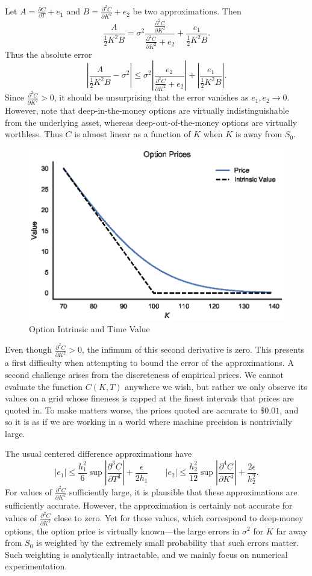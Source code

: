 \documentclass[12pt]{article}
\numberwithin{equation}{section}
\newcommand{\diff}[2]{\frac{\partial #1}{\partial #2}}
\newcommand{\abs}[1]{\left|#1\right|}
\begin{document}
Let $A = \diff{C}{T} + e_1$ and $B = \diff{^2C}{K^2} + e_2$ be two
approximations. Then \[ \frac{A}{\frac{1}{2}K^2 B} = \sigma^2
\frac{\diff{^2C}{K^2}}{\diff{^2C}{K^2} + e_2} + \frac{e_1}{\frac{1}{2}K^2 B}.
\]
Thus the absolute error \[
\abs{\frac{A}{\frac{1}{2}K^2 B} - \sigma^2} \le \sigma^2
\abs{\frac{e_2}{\diff{^2C}{K^2}+e_2}} + \abs{\frac{e_1}{\frac{1}{2}K^2B}}.
\]
Since $\diff{^2C}{K^2} > 0$, it should be unsurprising that the error vanishes
as $e_1,e_2 \to 0$. However, note that deep-in-the-money options are virtually
indistinguishable from the underlying asset, whereas deep-out-of-the-money
options are virtually worthless. Thus $C$ is almost linear as a function of $K$
when $K$ is away from $S_0$.

\begin{figure}[h]
\centering
\includegraphics{figs/intrinsicvalue}
\caption{Option Intrinsic and Time Value}
\label{fig:intrinsicvalue}
\end{figure}

Even though $\diff{^2C}{K^2} > 0$, the infimum of this second derivative is
zero. This presents a first difficulty when attempting to bound the error of the
approximations. A second challenge arises from the discreteness of empirical
prices. We cannot evaluate the function $C(K,T)$ anywhere we wish, but rather we
only observe its values on a grid whose fineness is capped at the finest
intervals that prices are quoted in. To make matters worse, the prices quoted
are accurate to $\$0.01$, and so it is as if we are working in a world where
machine precision is nontrivially large.


The usual centered difference approximations have
\[
|e_1|\le \frac{h_1^2}{6}\sup \abs{\diff{^3C}{T^3}} + \frac{\epsilon}{2h_1}
\qquad |e_2| \le \frac{h_2^2}{12}\sup \abs{\diff{^4C}{K^4}} +
\frac{2\epsilon}{h_2^2}.
\]
For values of $\diff{^2C}{K^2}$ sufficiently large, it is plausible that these
approximations are sufficiently accurate. However, the approximation is
certainly not accurate for values of $\diff{^2C}{K^2}$ close to zero. Yet for
these values, which correspond to deep-money options, the option price is
virtually known---the large errors in $\sigma^2$ for $K$ far away from $S_0$ is
weighted by the extremely small probability that such errors matter. Such
weighting is analytically intractable, and we mainly focus on numerical
experimentation. 
 
\end{document}
